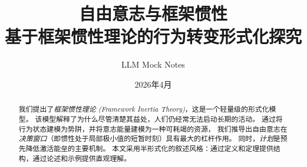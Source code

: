 




\title{\textbf{自由意志与框架惯性}\\[6pt]
       \large 基于框架惯性理论的行为转变形式化探究}
\author{LLM Mock Notes}
\date{2026年4月}
\maketitle

\begin{abstract}
我们提出了\emph{框架惯性理论 (Framework Inertia Theory)}，这是一个轻量级的形式化模型。
该模型解释了为什么尽管清楚其益处，人们仍经常无法启动长期的活动。
通过将行为状态建模为势阱，并将意志能量建模为一种可耗竭的资源，
我们推导出自由意志在\emph{决策窗口}（即惯性处于局部极小值的短暂时刻）具有最大的杠杆作用。
同时，\emph{计划}是预先降低激活能垒的主要机制。
本文采用半形式化的叙述风格：通过定义和定理提供结构，通过论述和示例提供直观理解。
\end{abstract}

\tableofcontents
\newpage




